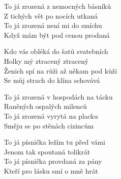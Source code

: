  \ve
To já zrozená z nemocných básníků\\
Z tichých vět po nocích utkaná\\
To já zrozená není mi do smíchu\\
Když mám být pod cenou prodaná

   \cho
Kdo vás obléká do šatů svatebních\\
Holky mý ztracený ztracený\\
Ženich spí na růži až někam pod kůži\\
Se můj strach do klína schovává

   \ve 
To já zrozená v hospodách na tácku\\
Raněných ospalých milenců\\
To já zrozená vyrytá na placku\\
Směju se po stěnách cizincům


   \ve 
To já písnička ležím tu před vámi\\
Jenom tak spoutaná tolikrát\\
To já písnička provdaná za pány\\
Kteří pro lásku smí o mně hrát

\esong
